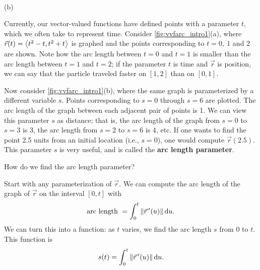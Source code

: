 {
\\(b)}

Currently, our vector-valued functions have defined points with a parameter $t$, which we often take to represent time. Consider \autoref{fig:vvfarc_intro1}(a), where $\vec r(t) =\left\langle t^2-t,t^2+t\right\rangle$ is graphed and the points corresponding to $t=0,\ 1$ and $2$ are shown. Note how the arc length between $t=0$ and $t=1$ is smaller than the arc length between $t=1$ and $t=2$; if the parameter $t$ is time and $\vec r$ is position, we can say that the particle traveled faster on $[1,2]$ than on $[0,1]$. 

Now consider \autoref{fig:vvfarc_intro1}(b), where the same graph is parameterized by a different variable $s$.  Points corresponding to $s=0$ through $s=6$ are plotted. The arc length of the graph between each adjacent pair of points is 1. We can view this parameter $s$ as distance; that is, the arc length of the graph from $s=0$ to $s=3$ is 3, the arc length from $s=2$ to $s=6$ is 4, etc. If one wants to find the point 2.5 units from an initial location (i.e., $s=0$), one would compute $\vec r(2.5)$. This parameter $s$ is very useful, and is called the \textbf{arc length parameter}.

How do we find the arc length parameter? 

Start with any parameterization of $\vec r$. We can compute the arc length of the graph of $\vec r$ on the interval $[0,t]$ with
\[\text{arc length } = \int_0^t\left\lVert \vec r\,'(u) \right\rVert\operatorname{d}\! u.\]
We can turn this into a function: as $t$ varies, we find the arc length $s$ from $0$ to $t$. This function is
\begin{equation}
s(t) = \int_0^t \left\lVert \vec r\,'(u) \right\rVert\operatorname{d}\! u.\label{eq:vvfarc}
\end{equation}

